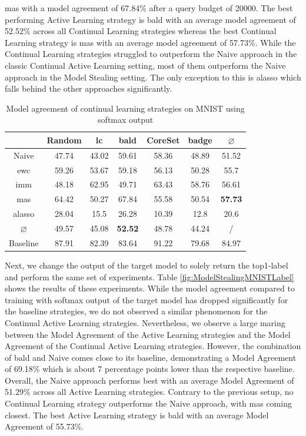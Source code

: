 \gls{mas} with a model agreement of 67.84\% after a query budget of 20000. The best performing Active Learning strategy is \gls{bald} with an average model agreement of 52.52\% across all Continual Learning strategies whereas the best Continual Learning strategy is \gls{mas} with an average
model agreement of 57.73\%. While the Continual Learning strategies struggled to outperform the Naive approach in the classic Continual Active Learning setting, most of them outperform the Naive approach in the Model Stealing setting. The only exception to this is \gls{alasso} which
falls behind the other approaches significantly. \par 

\begin{table}[h]
    \centering
    \begin{tabular}{ c | c c c c c | c } 
         & Random & \gls{lc} & \gls{bald} & CoreSet & \gls{badge} & $\varnothing$\\ 
        \hline
        Naive & 47.74 & 43.02 & 59.61 & 58.36 & 48.89 & 51.52\\
        \gls{ewc} &  59.26 & 53.67 & 59.18 & 56.13 & 50.28 & 55.7\\
        \gls{imm} & 48.18 & 62.95 & 49.71 & 63.43 & 58.76 & 56.61 \\
        \gls{mas} &  64.42 & 50.27 & 67.84 & 55.58 & 50.54 & \textbf{57.73}\\
        \gls{alasso} & 28.04 & 15.5 & 26.28 & 10.39 & 12.8 & 20.6\\
        \hline
        $\varnothing$ & 49.57 & 45.08 & \textbf{52.52} & 48.78 & 44.24 & /\\
        Baseline & 87.91 & 82.39 & 83.64 & 91.22 & 79.68 & 84.97\\
    \end{tabular}
    \caption{Model agreement of continual learning strategies on MNIST using softmax output}
    \label{fig:ModelStealingMNISTSoftmax}
\end{table}

Next, we change the output of the target model to solely return the top1-label and perform the same set of experiments. Table \ref{fig:ModelStealingMNISTLabel} shows the results of these experiments. While the model agreement compared to training with softmax output of the
target model has dropped significantly for the baseline strategies, we do not observed a similar phenomenon for the Continual Active Learning strategies. Nevertheless, we observe a large maring between the Model Agreement of the Active Learning strategies and the Model Agreement
of the Continual Active Learning strategies. However, the combination of \gls{bald} and Naive comes close to its baseline, demonstrating a Model Agreement of 69.18\% which is about 7 percentage points lower than the respective baseline. Overall, the Naive approach performs best with an
average Model Agreement of 51.29\% across all Active Learning strategies. Contrary to the previous setup, no Continual Learning strategy outperforms the Naive approach, with \gls{mas} coming closest. The best Active Learning strategy is \gls{bald} with an average Model Agreement of 55.73\%. \par 

